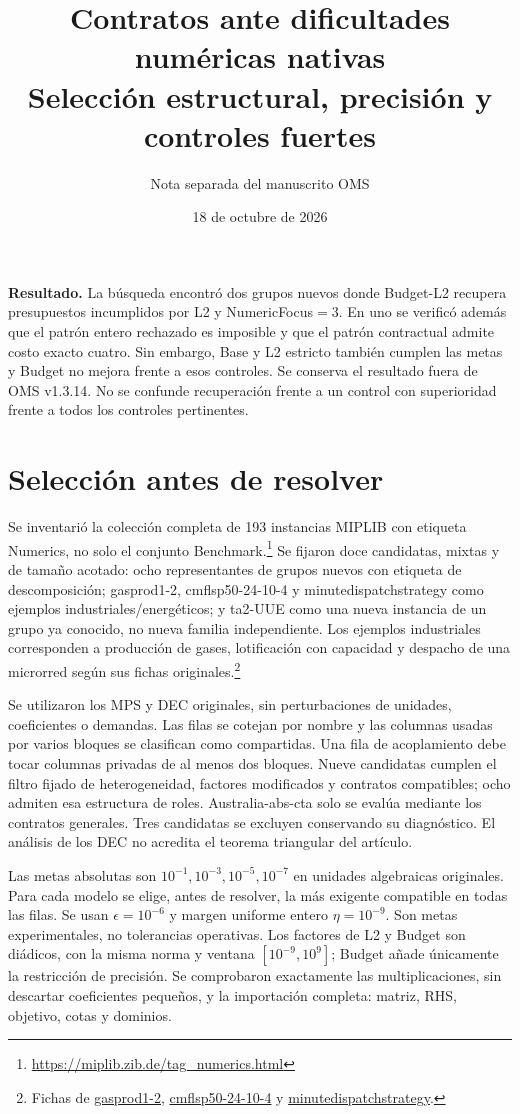 \documentclass[10pt,a4paper]{article}
\title{Contratos ante dificultades numéricas nativas\\Selección estructural, precisión y controles fuertes}
\author{Nota separada del manuscrito OMS}\date{18 de octubre de 2026}
\begin{document}
\maketitle
\noindent\textbf{Resultado.} La búsqueda encontró dos grupos nuevos donde Budget-L2
recupera presupuestos incumplidos por L2 y NumericFocus$=3$. En uno se verificó
además que el patrón entero rechazado es imposible y que el patrón contractual
admite costo exacto cuatro. Sin embargo, Base y L2 estricto también cumplen las
metas y Budget no mejora frente a esos controles. Se conserva el resultado fuera
de OMS v1.3.14. No se confunde recuperación frente a un control con superioridad
frente a todos los controles pertinentes.

\section{Selección antes de resolver}
Se inventarió la colección completa de 193 instancias MIPLIB con etiqueta
Numerics, no solo el conjunto Benchmark.\footnote{\url{https://miplib.zib.de/tag_numerics.html}}
Se fijaron doce candidatas, mixtas y de tamaño acotado: ocho representantes de
grupos nuevos con etiqueta de descomposición; gasprod1-2, cmflsp50-24-10-4 y
minutedispatchstrategy como ejemplos industriales/energéticos; y ta2-UUE como
una nueva instancia de un grupo ya conocido, no nueva familia independiente.
Los ejemplos industriales corresponden a producción de gases, lotificación con
capacidad y despacho de una microrred según sus fichas originales.\footnote{Fichas de
\href{https://miplib.zib.de/instance_details_gasprod1-2.html}{gasprod1-2},
\href{https://miplib.zib.de/instance_details_cmflsp50-24-10-4.html}{cmflsp50-24-10-4} y
\href{https://miplib.zib.de/instance_details_minutedispatchstrategy.html}{minutedispatchstrategy}.}

Se utilizaron los MPS y DEC originales, sin perturbaciones de unidades,
coeficientes o demandas. Las filas se cotejan por nombre y las columnas usadas
por varios bloques se clasifican como compartidas. Una fila de acoplamiento
debe tocar columnas privadas de al menos dos bloques. Nueve candidatas cumplen
el filtro fijado de heterogeneidad, factores modificados y contratos compatibles;
ocho admiten esa estructura de roles. Australia-abs-cta solo se evalúa mediante
los contratos generales. Tres candidatas se excluyen conservando su diagnóstico.
El análisis de los DEC no acredita el teorema triangular del artículo.

Las metas absolutas son $10^{-1},10^{-3},10^{-5},10^{-7}$ en unidades algebraicas
originales. Para cada modelo se elige, antes de resolver, la más exigente compatible
en todas las filas. Se usan $\epsilon=10^{-6}$ y margen uniforme entero
$\eta=10^{-9}$. Son metas experimentales, no tolerancias operativas.
Los factores de L2 y Budget son diádicos, con la misma norma y ventana
$[10^{-9},10^9]$; Budget añade únicamente la restricción de precisión.
Se comprobaron exactamente las multiplicaciones, sin descartar coeficientes
pequeños, y la importación completa: matriz, RHS, objetivo, cotas y dominios.
\end{document}
